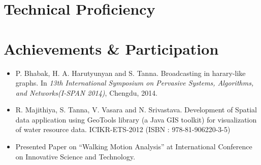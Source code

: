 \documentclass[11pt,a4paper,sans]{moderncv} %
\begin{document}


\section{Technical Proficiency}





\section{Achievements \& Participation}
\begin{itemize}
\item P. Bhabak, H. A. Harutyunyan and S. Tanna. Broadcasting in harary-like graphs. In \textit{13th International Symposium on Pervasive Systems, Algorithms, and Networks(I-SPAN 2014)}, Chengdu, 2014. \\
\item 	R. Majithiya, S. Tanna, V. Vasara and N. Srivastava. Development of Spatial data application using GeoTools library (a Java GIS toolkit) for visualization of water resource data. ICIKR-ETS-2012 (ISBN : 978-81-906220-3-5) \\
\item Presented Paper on ``Walking Motion Analysis'' at International Conference on Innovative Science and Technology.

\end{itemize}
\end{document}
